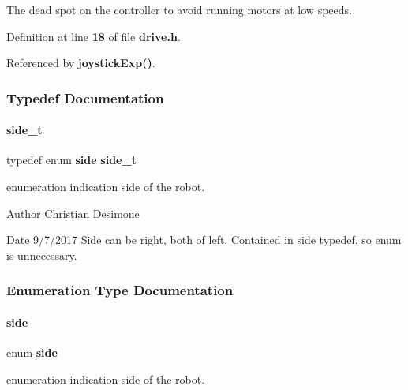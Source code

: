 The dead spot on the controller to avoid running motors at low speeds. 



Definition at line \textbf{ 18} of file \textbf{ drive.\+h}.



Referenced by \textbf{ joystick\+Exp()}.



\subsubsection{Typedef Documentation}
\mbox{\label{a00014_a9df2afd2f1acb97019655e5e730609c7}} 
\paragraph{side\+\_\+t}
{\footnotesize\ttfamily typedef enum \textbf{ side}  \textbf{ side\+\_\+t}}



enumeration indication side of the robot. 

\begin{DoxyAuthor}{Author}
Christian Desimone 
\end{DoxyAuthor}
\begin{DoxyDate}{Date}
9/7/2017 Side can be right, both of left. Contained in side typedef, so enum is unnecessary. 
\end{DoxyDate}


\subsubsection{Enumeration Type Documentation}
\mbox{\label{a00014_afc015eff6557e84151d2e53b94375445}} 
\paragraph{side}
{\footnotesize\ttfamily enum \textbf{ side}}



enumeration indication side of the robot. 

